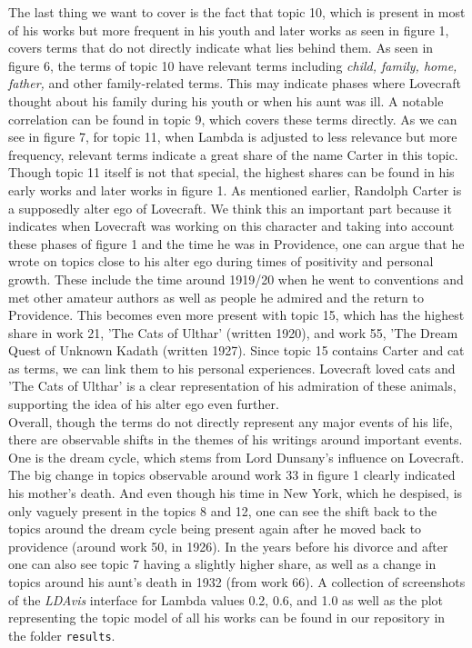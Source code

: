 The last thing we want to cover is the fact that topic 10, which is present in most of his works 
but more frequent in his youth and later works as seen in figure 1, covers terms that do not directly 
indicate what lies behind them. As seen in figure 6, the terms of topic 10 have relevant terms 
including \textit{child, family, home, father,} and other family-related terms. This may indicate phases 
where Lovecraft thought about his family during his youth or when his aunt was ill. A notable 
correlation can be found in topic 9, which covers these terms directly. As we can see in figure 
7, for topic 11, when Lambda is adjusted to less relevance but more frequency, relevant terms 
indicate a great share of the name Carter in this topic. Though topic 11 itself is not that special, 
the highest shares can be found in his early works and later works in figure 1. As mentioned earlier, 
Randolph Carter is a supposedly alter ego of Lovecraft. We think this an important part because it 
indicates when Lovecraft was working on this character and taking into account these phases of figure 
1 and the time he was in Providence, one can argue that he wrote on topics close to his alter ego 
during times of positivity and personal growth. These include the time around 1919/20 when he went 
to conventions and met other amateur authors as well as people he admired and the return to Providence. 
This becomes even more present with topic 15, which has the highest share in work 21, 'The Cats of 
Ulthar' (written 1920), and work 55, 'The Dream Quest of Unknown Kadath (written 1927). Since topic 
15 contains Carter and cat as terms, we can link them to his personal experiences. Lovecraft loved 
cats and 'The Cats of Ulthar' is a clear representation of his admiration of these animals, 
supporting the idea of his alter ego even further.\\

Overall, though the terms do not directly represent any major events of his life, there are 
observable shifts in the themes of his writings around important events. One is the dream cycle, 
which stems from Lord Dunsany's influence on Lovecraft. The big change in topics observable around 
work 33 in figure 1 clearly indicated his mother's death. And even though his time in New York, 
which he despised, is only vaguely present in the topics 8 and 12, one can see the shift back to 
the topics around the dream cycle being present again after he moved back to providence (around 
work 50, in 1926). In the years before his divorce and after one can also see topic 7 having a 
slightly higher share, as well as a change in topics around his aunt's death in 1932 (from work 
66). A collection of screenshots of the \textit{LDAvis} interface for Lambda values 0.2, 0.6, and 1.0 as 
well as the plot representing the topic model of all his works can be found in our repository in 
the folder \texttt{results}.
